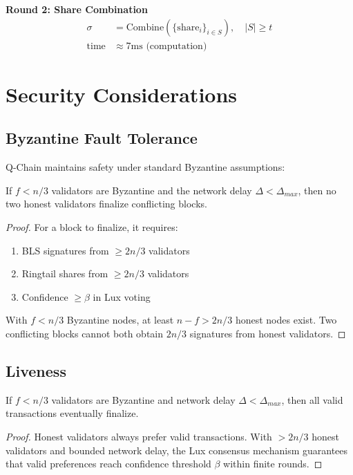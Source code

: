 \documentclass[11pt]{article}
\begin{document}
\textbf{Round 2: Share Combination}
\begin{align}
\sigma &= \text{Combine}(\{\text{share}_i\}_{i \in S}), \quad |S| \geq t \\
\text{time} &\approx 7\text{ms (computation)}
\end{align}

\section{Security Considerations}

\subsection{Byzantine Fault Tolerance}

Q-Chain maintains safety under standard Byzantine assumptions:

\begin{theorem}[Safety]
If $f < n/3$ validators are Byzantine and the network delay $\Delta < \Delta_{max}$, then no two honest validators finalize conflicting blocks.
\end{theorem}

\begin{proof}
For a block to finalize, it requires:
\begin{enumerate}
\item BLS signatures from $\geq 2n/3$ validators
\item Ringtail shares from $\geq 2n/3$ validators
\item Confidence $\geq \beta$ in Lux voting
\end{enumerate}

With $f < n/3$ Byzantine nodes, at least $n - f > 2n/3$ honest nodes exist. Two conflicting blocks cannot both obtain $2n/3$ signatures from honest validators.
\end{proof}

\subsection{Liveness}

\begin{theorem}[Liveness]
If $f < n/3$ validators are Byzantine and network delay $\Delta < \Delta_{max}$, then all valid transactions eventually finalize.
\end{theorem}

\begin{proof}
Honest validators always prefer valid transactions. With $>2n/3$ honest validators and bounded network delay, the Lux consensus mechanism guarantees that valid preferences reach confidence threshold $\beta$ within finite rounds.
\end{proof}
\end{document}

